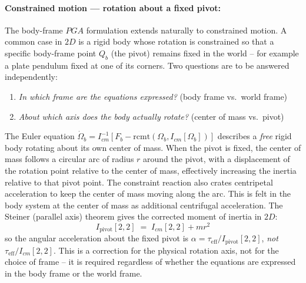 \paragraph{Constrained motion --- rotation about a fixed pivot:}
The body-frame $PGA$ formulation extends naturally to constrained motion. A common case in
$2D$ is a rigid body whose rotation is constrained so that a specific body-frame point
$Q_b$ (the pivot) remains fixed in the world -- for example a plate pendulum fixed at one
of its corners. Two questions are to be answered independently:
\begin{enumerate}
    \item \emph{In which frame are the equations expressed?} (body frame vs.\ world frame)
    \item \emph{About which axis does the body actually rotate?} (center of mass vs.\
    pivot)
\end{enumerate}
The Euler equation $\dot{\Omega}_b = I_{cm}^{-1}[F_b - \mathrm{rcmt}(\Omega_b,
I_{cm}[\Omega_b])]$ describes a \emph{free} rigid body rotating about its own center of
mass. When the pivot is fixed, the center of mass follows a circular arc of radius $r$
around the pivot, with a displacement of the rotation point relative to the center of
mass, effectively increasing the inertia relative to that pivot point. The constraint
reaction also crates centripetal acceleration to keep the center of mass moving along the
arc. This is felt in the body system at the center of mass as additional centrifugal
acceleration. The Steiner (parallel axis) theorem gives the corrected moment of inertia in
$2D$:
\begin{equation}
    I_\text{pivot}[2,2] \;=\; I_{cm}[2,2] + m r^2
    \label{eq:steiner_2d}
\end{equation}
so the angular acceleration about the fixed pivot is $\alpha = \tau_\text{eff} /
I_\text{pivot}[2,2]$, \emph{not} $\tau_\text{eff}/I_{cm}[2,2]$. This is a correction for
the physical rotation axis, not for the choice of frame -- it is required regardless of
whether the equations are expressed in the body frame or the world frame. \\

